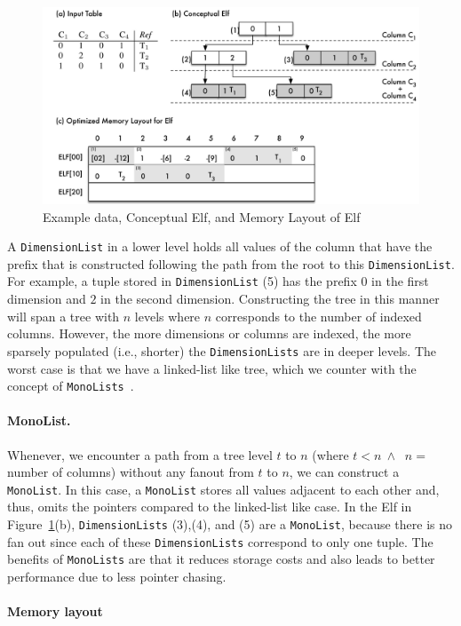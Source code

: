\documentclass[runningheads,a4paper]{llncs}
\begin{document}
\begin{figure}[htb]
	\centering
		\includegraphics[width=.9\textwidth]{Elf.pdf}
	\caption{Example data, Conceptual Elf, and Memory Layout of Elf}
	\label{fig:Elf}
\end{figure}

A \verb.DimensionList. in a lower level holds all values of the column that have the prefix that is constructed following the path from the root to this \verb.DimensionList.. For example, a tuple stored in  \verb.DimensionList. (5) has the prefix $0$ in the first dimension and $2$ in the second dimension. Constructing the tree in this manner will span a tree with $n$ levels where $n$ corresponds to the number of indexed columns. However, the more dimensions or columns are indexed, the more sparsely populated (i.e., shorter) the  \verb.DimensionLists. are in deeper levels. The worst case is that we have a linked-list like tree, which we counter with the concept of  \verb.MonoLists.~\cite{BKS+17}.



\paragraph{MonoList.} Whenever, we encounter a path from a tree level $t$ to $n$ (where $t < n~\land~$ $n=$ number of columns) without any fanout from $t$ to $n$, we can construct a \verb.MonoList.. In this case, a \verb.MonoList. stores all values adjacent to each other and, thus, omits the pointers compared to the linked-list like case. In the Elf in Figure~\ref{fig:Elf}(b), \verb.DimensionLists. (3),(4), and (5) are a \verb.MonoList., because there is no fan out since each of these \verb.DimensionLists. correspond to only one tuple. The benefits of \verb.MonoLists. are that it reduces storage costs and also leads to better performance due to less pointer chasing. 


\paragraph{Memory layout}
\end{document}
